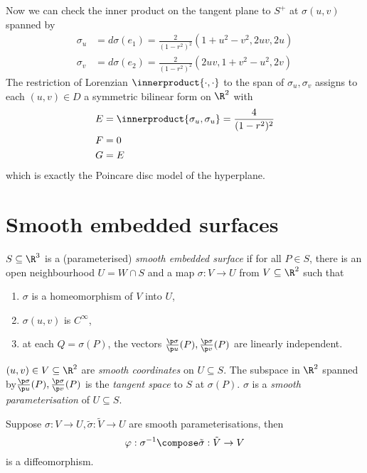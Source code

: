 \documentclass[a4paper]{article}
\theoremstyle{definition}
\newcommand*{\inner}{\innerproduct}
\begin{document}
Now we can check the inner product on the tangent plane to \(S^+\) at \(\sigma(u, v)\) spanned by
\begin{align*}
  \sigma_u &= d\sigma(e_1) = \frac{2}{(1 - r^2)^2} (1 + u^2 - v^2, 2uv, 2u) \\
  \sigma_v &=  d\sigma(e_2) = \frac{2}{(1 - r^2)^2} (2uv, 1 + v^2 - u^2, 2v)
\end{align*}
The restriction of Lorenzian \(\inner{\cdot, \cdot}\) to the span of \(\sigma_u, \sigma_v\) assigns to each \((u, v) \in D\) a symmetric bilinear form on \(\R^2\) with
\begin{align*}
  E &= \inner{\sigma_u, \sigma_u} = \frac{4}{(1 - r^2)^2} \\
  F &= 0 \\
  G &= E
\end{align*}
which is exactly the Poincare disc model of the hyperplane.

\section{Smooth embedded surfaces}

\begin{definition}
  \(S \subseteq \R^3\) is a (parameterised) \emph{smooth embedded surface} if for all \(P \in S\), there is an open neighbourhood \(U = W \cap S\) and a map \(\sigma: V \to U\) from \(V \subseteq \R^2\) such that
  \begin{enumerate}
  \item \(\sigma\) is a homeomorphism of \(V\) into \(U\),
  \item \(\sigma(u, v)\) is \(C^\infty\),
  \item at each \(Q = \sigma(P)\), the vectors \(\frac{\p \sigma}{\p u}(P), \frac{\p \sigma}{\p v}(P)\) are linearly independent.
  \end{enumerate}
\end{definition}

\((u, v) \in V \subseteq \R^2\) are \emph{smooth coordinates} on \(U \subseteq S\). The subspace in \(\R^2\) spanned by\(\frac{\p \sigma}{\p u}(P), \frac{\p \sigma}{\p v}(P)\) is the \emph{tangent space} to \(S\) at \(\sigma(P)\). \(\sigma\) is a \emph{smooth parameterisation} of \(U \subseteq S\).

\begin{proposition}
  Suppose \(\sigma: V \to U, \tilde \sigma: \tilde V \to U\) are smooth parameterisations, then
  \[
    \varphi: \sigma^{-1} \compose \tilde \sigma: \tilde V \to V
  \]
  is a diffeomorphism.
\end{proposition}
\end{document}
